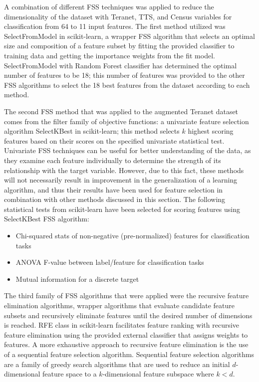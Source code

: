 A combination of different FSS techniques was applied to reduce the dimensionality of the dataset with Teranet, TTS, and Census variables for classification from 64 to 11 input features.
The first method utilized was SelectFromModel in scikit-learn, a wrapper FSS algorithm that selects an optimal size and composition of a feature subset by fitting the provided classifier to training data and getting the importance weights from the fit model.
SelectFromModel with Random Forest classifier has determined the optimal number of features to be 18;
this number of features was provided to the other FSS algorithms to select the 18 best features from the dataset according to each method.

The second FSS method that was applied to the augmented Teranet dataset comes from the filter family of objective functions: a univariate feature selection algorithm SelectKBest in scikit-learn;
this method selects $k$ highest scoring features based on their scores on the specified univariate statistical test.
Univariate FSS techniques can be useful for better understanding of the data, as they examine each feature individually to determine the strength of its relationship with the target variable.
However, due to this fact, these methods will not necessarily result in improvement in the generalization of a learning algorithm, and thus their results have been used for feature selection in combination with other methods discussed in this section.
The following statistical tests from scikit-learn have been selected for scoring features using SelectKBest FSS algorithm:

\begin{itemize}
    \item Chi-squared stats of non-negative (pre-normalized) features for classification tasks
    \item ANOVA F-value between label/feature for classification tasks
    \item Mutual information for a discrete target
\end{itemize}

The third family of FSS algorithms that were applied were the recursive feature elimination algorithms, wrapper algorithms that evaluate candidate feature subsets and recursively eliminate features until the desired number of dimensions is reached.
RFE class in scikit-learn facilitates feature ranking with recursive feature elimination using the provided external classifier that assigns weights to features.
A more exhaustive approach to recursive feature elimination is the use of a sequential feature selection algorithm.
Sequential feature selection algorithms are a family of greedy search algorithms that are used to reduce an initial $d$-dimensional feature space to a $k$-dimensional feature subspace where $k<d$.

